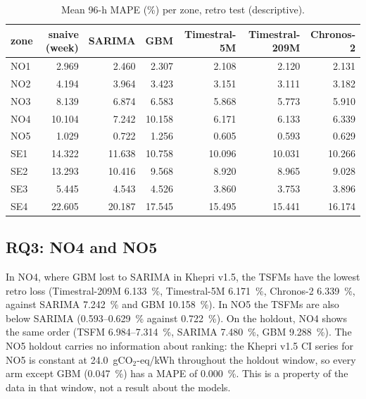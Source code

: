 \begin{table}[t]
\centering
\caption{Mean 96-h MAPE (\%) per zone, retro test (descriptive).}
\label{tab:zones}
\begin{tabular}{lrrrrrr}
\toprule
zone & snaive (week) & SARIMA & GBM & Timestral-5M & Timestral-209M & Chronos-2 \\
\midrule
NO1 & 2.969 & 2.460 & 2.307 & 2.108 & 2.120 & 2.131 \\
NO2 & 4.194 & 3.964 & 3.423 & 3.151 & 3.111 & 3.182 \\
NO3 & 8.139 & 6.874 & 6.583 & 5.868 & 5.773 & 5.910 \\
NO4 & 10.104 & 7.242 & 10.158 & 6.171 & 6.133 & 6.339 \\
NO5 & 1.029 & 0.722 & 1.256 & 0.605 & 0.593 & 0.629 \\
SE1 & 14.322 & 11.638 & 10.758 & 10.096 & 10.031 & 10.266 \\
SE2 & 13.293 & 10.416 & 9.568 & 8.920 & 8.965 & 9.028 \\
SE3 & 5.445 & 4.543 & 4.526 & 3.860 & 3.753 & 3.896 \\
SE4 & 22.605 & 20.187 & 17.545 & 15.495 & 15.441 & 16.174 \\
\bottomrule
\end{tabular}
\end{table}

\subsection{RQ3: NO4 and NO5}
In NO4, where GBM lost to SARIMA in Khepri v1.5, the TSFMs have the lowest retro loss
(Timestral-209M 6.133~\%, Timestral-5M 6.171~\%, Chronos-2 6.339~\%, against SARIMA 7.242~\% and
GBM 10.158~\%). In NO5 the TSFMs are also below SARIMA (0.593--0.629~\% against 0.722~\%). On the
holdout, NO4 shows the same order (TSFM 6.984--7.314~\%, SARIMA 7.480~\%, GBM 9.288~\%). The NO5
holdout carries no information about ranking: the Khepri v1.5 CI series for NO5 is constant at
24.0~gCO$_2$-eq/kWh throughout the holdout window, so every arm except GBM (0.047~\%) has a MAPE of
0.000~\%. This is a property of the data in that window, not a result about the models.

